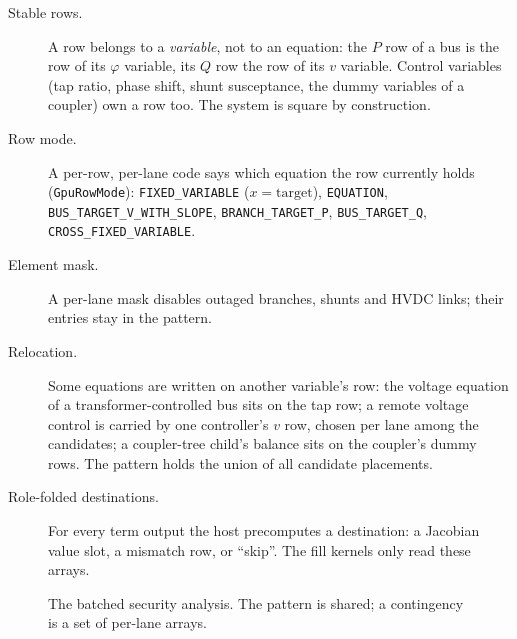 \documentclass[11pt,a4paper]{article}
\newcommand{\code}[1]{\texttt{\small #1}}
\begin{document}
\begin{description}
\item[Stable rows.] A row belongs to a \emph{variable}, not to an equation: the $P$ row
      of a bus is the row of its $\varphi$ variable, its $Q$ row the row of its $v$
      variable. Control variables (tap ratio, phase shift, shunt susceptance, the dummy
      variables of a coupler) own a row too. The system is square by construction.
\item[Row mode.] A per-row, per-lane code says which equation the row currently holds
      (\code{GpuRowMode}): \code{FIXED\_VARIABLE} ($x = \text{target}$),
      \code{EQUATION}, \code{BUS\_TARGET\_V\_WITH\_SLOPE}, \code{BRANCH\_TARGET\_P},
      \code{BUS\_TARGET\_Q}, \code{CROSS\_FIXED\_VARIABLE}.
\item[Element mask.] A per-lane mask disables outaged branches, shunts and HVDC links;
      their entries stay in the pattern.
\item[Relocation.] Some equations are written on another variable's row: the voltage
      equation of a transformer-controlled bus sits on the tap row; a remote voltage
      control is carried by one controller's $v$ row, chosen per lane among the
      candidates; a coupler-tree child's balance sits on the coupler's dummy rows. The
      pattern holds the union of all candidate placements.
\item[Role-folded destinations.] For every term output the host precomputes a
      destination: a Jacobian value slot, a mismatch row, or ``skip''. The fill kernels
      only read these arrays.
\end{description}

\begin{figure}[h]
\centering
{}
\caption{The batched security analysis. The pattern is shared; a contingency is a set of
per-lane arrays.}
\label{fig:batch}
\end{figure}
\end{document}
